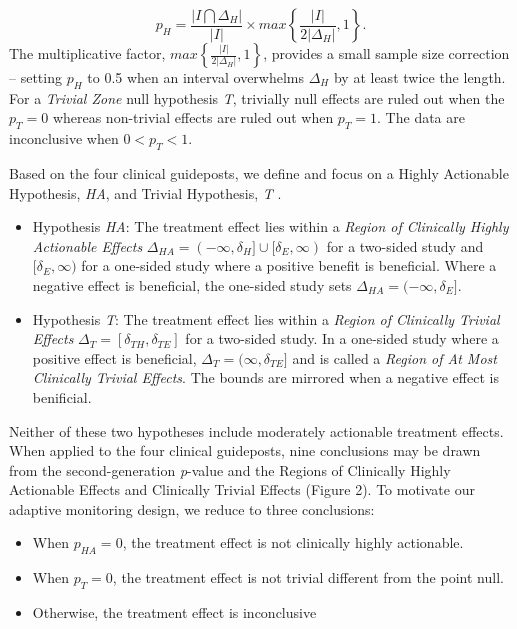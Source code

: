 \documentclass[12pt,oneside]{book}
\providecommand{\tightlist}{%
  \setlength{\itemsep}{0pt}\setlength{\parskip}{0pt}}
\newlength{\li}\setlength{\li}{14.48pt}
\newlength{\di}\setlength{\di}{-3.5mm}
\theoremstyle{definition}
\theoremstyle{definition}
\theoremstyle{definition}
\theoremstyle{remark}
\begin{document}
\[
p_{H} = \frac{| I \bigcap \Delta_H |}{|I|} \times max\left\{\frac{| I |}{2 | \Delta_H |}, 1 \right\}.
\] The multiplicative factor,
\(max\left\{\frac{| I |}{2 | \Delta_H |}, 1 \right\}\), provides a small
sample size correction -- setting \(p_H\) to 0.5 when an interval
overwhelms \(\Delta_H\) by at least twice the length. For a
\emph{Trivial Zone} null hypothesis \emph{T}, trivially null effects are
ruled out when the \(p_T = 0\) whereas non-trivial effects are ruled out
when \(p_T = 1\). The data are inconclusive when \(0 < p_T < 1\).

Based on the four clinical guideposts, we define and focus on a Highly
Actionable Hypothesis, \emph{HA}, and Trivial Hypothesis, \emph{T} .

\begin{itemize}
\item
  Hypothesis \emph{HA}: The treatment effect lies within a \emph{Region
  of Clinically Highly Actionable Effects}
  \(\Delta_{HA} = (-\infty, \delta_{H}] \cup [\delta_{E}, \infty)\) for
  a two-sided study and \([\delta_{E}, \infty)\) for a one-sided study
  where a positive benefit is beneficial. Where a negative effect is
  beneficial, the one-sided study sets
  \(\Delta_{HA} = (-\infty, \delta_{E}]\).
\item
  Hypothesis \emph{T}: The treatment effect lies within a \emph{Region
  of Clinically Trivial Effects}
  \(\Delta_T = [\delta_{TH}, \delta_{TE}]\) for a two-sided study. In a
  one-sided study where a positive effect is beneficial,
  \(\Delta_T = (\infty, \delta_{TE}]\) and is called a \emph{Region of
  At Most Clinically Trivial Effects}. The bounds are mirrored when a
  negative effect is benificial.
\end{itemize}

Neither of these two hypotheses include moderately actionable treatment
effects. When applied to the four clinical guideposts, nine conclusions
may be drawn from the second-generation \emph{p}-value and the Regions
of Clinically Highly Actionable Effects and Clinically Trivial Effects
(Figure 2). To motivate our adaptive monitoring design, we reduce to
three conclusions:

\begin{itemize}
\tightlist
\item
  When \(p_{HA} = 0\), the treatment effect is not clinically highly
  actionable.
\item
  When \(p_{T} = 0\), the treatment effect is not trivial different from
  the point null.
\item
  Otherwise, the treatment effect is inconclusive
\end{itemize}
\end{document}
